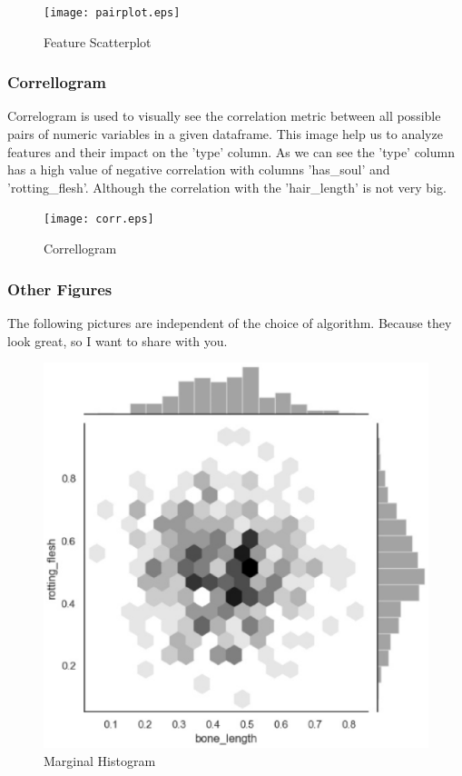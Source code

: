 \begin{figure}[h]\centering
	\texttt{[image: pairplot.eps]}
	\caption{Feature Scatterplot}
\end{figure}


\subsubsection{Correllogram}
Correlogram is used to visually see the correlation metric between all possible pairs of numeric variables in a given dataframe. This image help us to analyze features and their impact on the 'type' column. As we can see the 'type' column has a high value of negative correlation with columns 'has_soul' and 'rotting_flesh'. Although the correlation with the 'hair_length' is not very big.


\begin{figure}[h]\centering
	\texttt{[image: corr.eps]}
	\caption{Correllogram}
\end{figure}


\subsubsection{Other Figures}
The following pictures are independent of the choice of algorithm. Because they look great, so I want to share with you.

\begin{figure}[h]\centering
	\includegraphics[scale=0.3]{MHis.eps}
	\caption{Marginal Histogram}
\end{figure}




